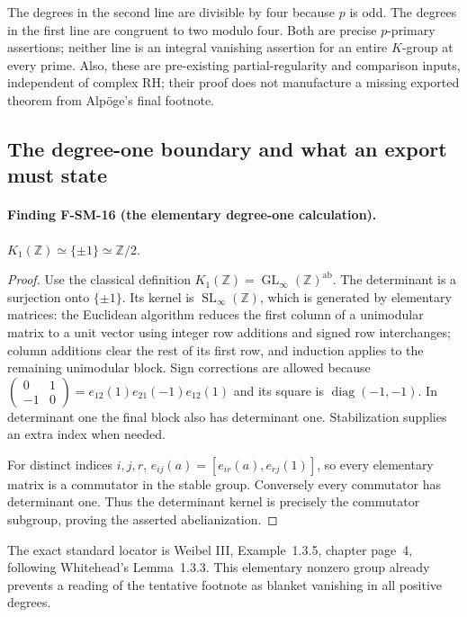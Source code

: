 The degrees in the second line are divisible by four because $p$ is
odd.  The degrees in the first line are congruent to two modulo four.
Both are precise $p$-primary assertions; neither line is an integral
vanishing assertion for an entire $K$-group at every prime.  Also, these
are pre-existing partial-regularity and comparison inputs, independent
of complex RH; their proof does not manufacture a missing exported
theorem from Alp\"oge's final footnote.

\subsection{The degree-one boundary and what an export must state}

\paragraph{Finding F-SM-16 (the elementary degree-one calculation).}
$K_1(\mathbb Z)\simeq\{\pm1\}\simeq\mathbb Z/2$.

\begin{proof}
Use the classical definition
$K_1(\mathbb Z)=\operatorname{GL}_\infty(\mathbb Z)^{\mathrm{ab}}$.
The determinant is a surjection onto $\{\pm1\}$.  Its kernel is
$\operatorname{SL}_\infty(\mathbb Z)$, which is generated by elementary
matrices: the Euclidean algorithm reduces the first column of a
unimodular matrix to a unit vector using integer row additions and signed
row interchanges; column additions clear the rest of its first row, and
induction applies to the remaining unimodular block.  Sign corrections
are allowed because
$\left(\begin{smallmatrix}0&1\\-1&0\end{smallmatrix}\right)
=e_{12}(1)e_{21}(-1)e_{12}(1)$ and its square is
$\operatorname{diag}(-1,-1)$.  In determinant one the final block also
has determinant one.  Stabilization supplies an extra index when needed.

For distinct indices $i,j,r$,
$e_{ij}(a)=[e_{ir}(a),e_{rj}(1)]$, so every elementary matrix is a
commutator in the stable group.  Conversely every commutator has
determinant one.  Thus the determinant kernel is precisely the
commutator subgroup, proving the asserted abelianization.
\end{proof}
The exact standard locator is Weibel III, Example~1.3.5, chapter
page~4, following Whitehead's Lemma~1.3.3.  This elementary nonzero
group already prevents a reading of the tentative footnote as blanket
vanishing in all positive degrees.

